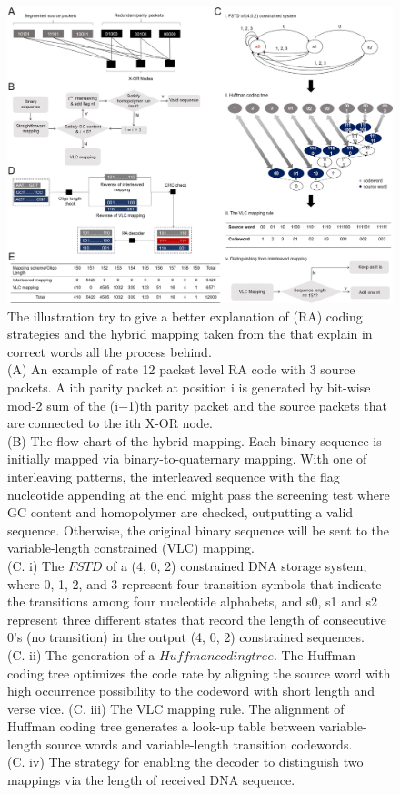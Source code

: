 \documentclass[10pt,twocolumn,twoside]{gsajnl}
\begin{document}
\begin{figure}[h!]
\centering
\includegraphics[width=\linewidth]{figure hybrid mapping.jpg}
\caption{The illustration try to give a better explanation of (RA) coding strategies and the hybrid mapping taken from the \cite{wang2019high} that explain in correct words all the process behind.
\\(A) An example of rate 12 packet level RA code with 3 source packets. A ith parity packet at position i is generated by bit-wise mod-2 sum of the (i−1)th parity packet and the source packets that are connected to the ith X-OR node. 
\\(B) The flow chart of the hybrid mapping. Each binary sequence is initially mapped via binary-to-quaternary mapping. With one of interleaving patterns, the interleaved sequence with the flag nucleotide appending at the end might pass the screening test where GC content and homopolymer are checked, outputting a valid sequence. Otherwise, the original binary sequence will be sent to the variable-length constrained (VLC) mapping.
\\(C. i) The $FSTD$ of a (4, 0, 2) constrained DNA storage system, where 0, 1, 2, and 3 represent four transition symbols that indicate the transitions among four nucleotide alphabets, and s0, s1 and s2 represent three different states that record the length of consecutive 0’s (no transition) in the output (4, 0, 2) constrained sequences. 
\\(C. ii) The generation of a $Huffman coding tree$. The Huffman coding tree optimizes the code rate by aligning the source word with high occurrence possibility to the codeword with short length and verse vice. (C. iii) The VLC mapping rule. The alignment of Huffman coding tree generates a look-up table between variable-length source words and variable-length transition codewords. \\(C. iv) The strategy for enabling the decoder to distinguish two mappings via the length of received DNA sequence. 
}
\end{figure}
\end{document}
